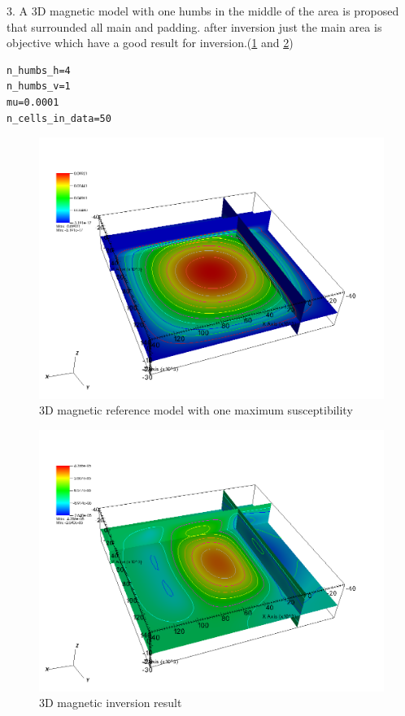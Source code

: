 3. A 3D magnetic model with one humbs in the middle of the area is proposed that surrounded all main and padding. after inversion just the main area is objective which have a good result for inversion.(\ref{fig:mag3D1-ref} and \ref{fig:mag3D1})

\begin{verbatim}
n_humbs_h=4
n_humbs_v=1
mu=0.0001
n_cells_in_data=50
\end{verbatim}

\begin{figure}
\centering
\includegraphics[width=\textwidth]{mag3D1-ref.png}
\caption{3D magnetic reference model with one maximum susceptibility}
\label{fig:mag3D1-ref}
\end{figure}

\begin{figure}
\centering
\includegraphics[width=\textwidth]{mag3D1.png}
\caption{3D magnetic inversion result}
\label{fig:mag3D1}
\end{figure}
